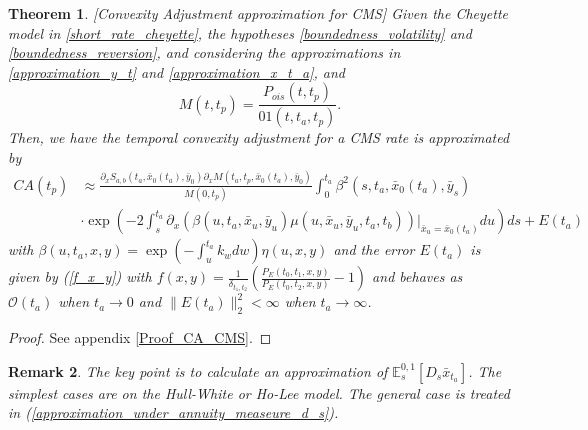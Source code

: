 \documentclass[a4paper,10pt]{article}
\newtheorem{theorem}{Theorem}[section]
\newtheorem{remark}[theorem]{Remark}
\newcommand{\1}{\mathbf{1}}
\begin{document}
\begin{theorem}\label{Th_CA_CMS}[Convexity Adjustment approximation for CMS]
Given the Cheyette model in \eqref{short_rate_cheyette}, the hypotheses \ref{boundedness_volatility} and \ref{boundedness_reversion}, and considering the approximations in \eqref{approximation_y_t} and \eqref{approximation_x_t_a}, and
\begin{equation}
M(t,t_p)= \frac{P_{ois}(t,t_p)}{01(t,t_a,t_p)}.
\end{equation}
Then, we have the temporal convexity adjustment for a CMS rate is approximated by
\begin{align} \label{cms_first_order_convexity}
CA(t_p) &\approx  \frac{\partial_x S_{a,b}(t_a,\bar{x}_0(t_a), \bar{y}_0) \partial_x M(t_a,t_p,\bar{x}_0(t_a), \bar{y}_0)}{M(0,t_p)} \int_{0}^{t_a}  \beta^2(s,t_a,\bar{x}_0(t_a),\bar{y}_s) \\
&\cdot  \exp\left(-2\int_{s}^{t_a}\partial_x (\beta(u,t_a,\bar{x}_u,\bar{y}_u) \mu(u,\bar{x}_u, \bar{y}_u,t_a,t_b))|_{\bar{x}_u=\bar{x}_{0}(t_a)}  du \right)ds + E(t_a)\nonumber 
\end{align}
with  $\beta(u,t_a,x,y) = \exp\left(-\int_{u}^{t_a}k_w dw\right)\eta(u,x,y)$ and the error $E(t_a)$ is given by (\ref{f_x_y}) with $f(x,y)=\frac{1}{\delta_{t_1,t_2}}\left(\frac{P_{E}(t_0,t_1,x,y)}{P_{E}(t_0,t_2,x,y)} - 1 \right)$ and behaves as $\mathcal{O}(t_a)$ when $t_a \to 0$ and $\|E(t_a)\|^{2}_{2} < \infty$ when $t_a \to \infty$.
\end{theorem}
\begin{proof}
See appendix \ref{Proof_CA_CMS}.
\end{proof}

\begin{remark}
The key point is to calculate an approximation of $\mathbb{E}_s^{0,1}\left[ D_s \bar{x}_{t_a}\right]$. The simplest cases are on the Hull-White or Ho-Lee model. The general case is treated in (\ref{approximation_under_annuity_measeure_d_s}). 
\end{remark}
\end{document}
